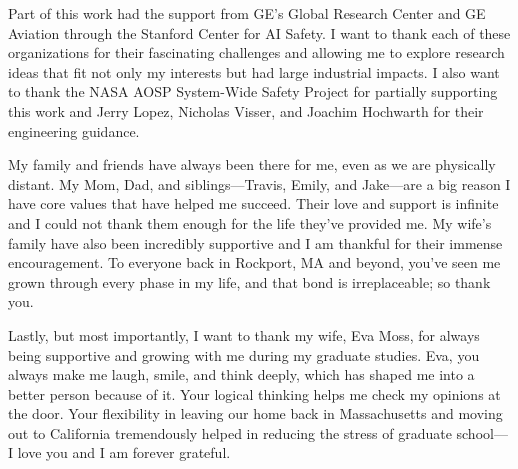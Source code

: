 Part of this work had the support from GE's Global Research Center and GE Aviation through the Stanford Center for AI Safety.
I want to thank each of these organizations for their fascinating challenges and allowing me to explore research ideas that fit not only my interests but had large industrial impacts.
I also want to thank the NASA AOSP System-Wide Safety Project for partially supporting this work and Jerry Lopez, Nicholas Visser, and Joachim Hochwarth for their engineering guidance.

My family and friends have always been there for me, even as we are physically distant.
My Mom, Dad, and siblings---Travis, Emily, and Jake---are a big reason I have core values that have helped me succeed.
Their love and support is infinite and I could not thank them enough for the life they've provided me.
My wife's family have also been incredibly supportive and I am thankful for their immense encouragement.
To everyone back in Rockport, MA and beyond, you've seen me grown through every phase in my life, and that bond is irreplaceable; so thank you.

Lastly, but most importantly, I want to thank my wife, Eva Moss, for always being supportive and growing with me during my graduate studies.
Eva, you always make me laugh, smile, and think deeply, which has shaped me into a better person because of it.
Your logical thinking helps me check my opinions at the door.
Your flexibility in leaving our home back in Massachusetts and moving out to California tremendously helped in reducing the stress of graduate school---I love you and I am forever grateful.
